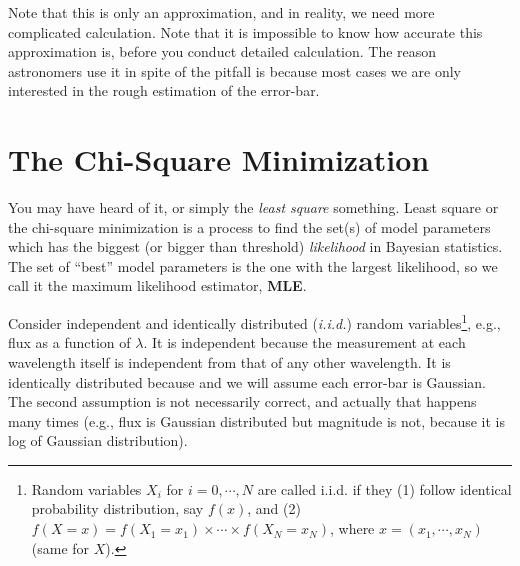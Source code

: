 Note that this is only an approximation, and in reality, we need more complicated calculation. Note that it is impossible to know how accurate this approximation is, before you conduct detailed calculation. The reason astronomers use it in spite of the pitfall is because most cases we are only interested in the rough estimation of the error-bar.




\section{The Chi-Square Minimization}
You may have heard of it, or simply the \textit{least square} something. Least square or the chi-square minimization is a process to find the set(s) of model parameters which has the biggest (or bigger than threshold) \textit{likelihood} in Bayesian statistics. The set of ``best'' model parameters is the one with the largest likelihood, so we call it the maximum likelihood estimator, \textbf{MLE}.

Consider independent and identically distributed (\textit{i.i.d.}) random variables\footnote{Random variables $ X_{i} $ for $ i = 0, \cdots, N $ are called i.i.d. if they (1) follow identical probability distribution, say $ f(x) $, and (2) $ f(X = x) = f(X_1 = x_1) \times \cdots \times f(X_N = x_N) $, where $ x = (x_1, \cdots , x_N) $ (same for $ X $). }, e.g., flux as a function of $ \lambda $. It is independent because the measurement at each wavelength itself is independent from that of any other wavelength. It is identically distributed because and we will assume each error-bar is Gaussian. The second assumption is not necessarily correct, and actually that happens many times (e.g., flux is Gaussian distributed but magnitude is not, because it is log of Gaussian distribution).

